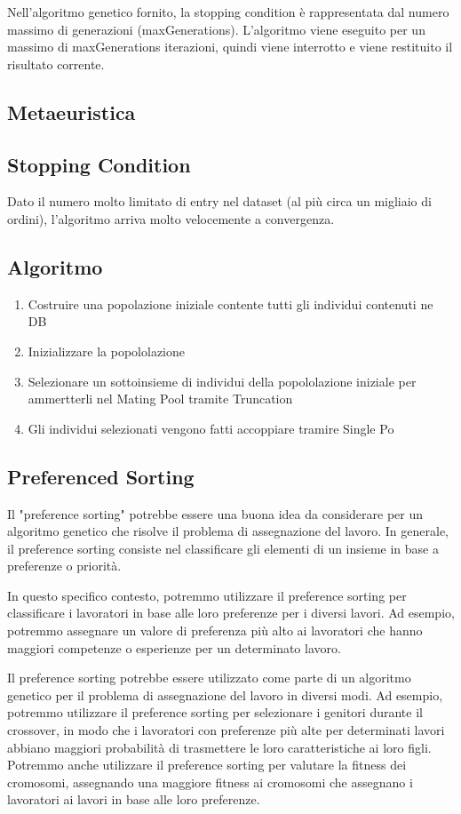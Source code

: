 Nell'algoritmo genetico fornito, la stopping condition è rappresentata dal numero massimo di generazioni (maxGenerations). L'algoritmo viene eseguito per un massimo di maxGenerations iterazioni, quindi viene interrotto e viene restituito il risultato corrente.

\subsection{Metaeuristica}

\subsection{Stopping Condition}
Dato il numero molto limitato di entry nel dataset  (al più circa  un migliaio di ordini), l'algoritmo arriva molto velocemente a convergenza. 

\subsection{Algoritmo}
\begin{enumerate}
\item Costruire una popolazione iniziale contente tutti gli individui contenuti ne DB
\item Inizializzare la popololazione
\item Selezionare un sottoinsieme di individui della popololazione iniziale per ammertterli nel Mating Pool tramite Truncation 
\item Gli individui selezionati vengono fatti accoppiare tramire Single Po
\end{enumerate}

\subsection {Preferenced Sorting}
Il "preference sorting" potrebbe essere una buona idea da considerare per un algoritmo genetico che risolve il problema di assegnazione del lavoro. In generale, il preference sorting consiste nel classificare gli elementi di un insieme in base a preferenze o priorità.

In questo specifico contesto, potremmo utilizzare il preference sorting per classificare i lavoratori in base alle loro preferenze per i diversi lavori. Ad esempio, potremmo assegnare un valore di preferenza più alto ai lavoratori che hanno maggiori competenze o esperienze per un determinato lavoro.

Il preference sorting potrebbe essere utilizzato come parte di un algoritmo genetico per il problema di assegnazione del lavoro in diversi modi. Ad esempio, potremmo utilizzare il preference sorting per selezionare i genitori durante il crossover, in modo che i lavoratori con preferenze più alte per determinati lavori abbiano maggiori probabilità di trasmettere le loro caratteristiche ai loro figli. Potremmo anche utilizzare il preference sorting per valutare la fitness dei cromosomi, assegnando una maggiore fitness ai cromosomi che assegnano i lavoratori ai lavori in base alle loro preferenze.



